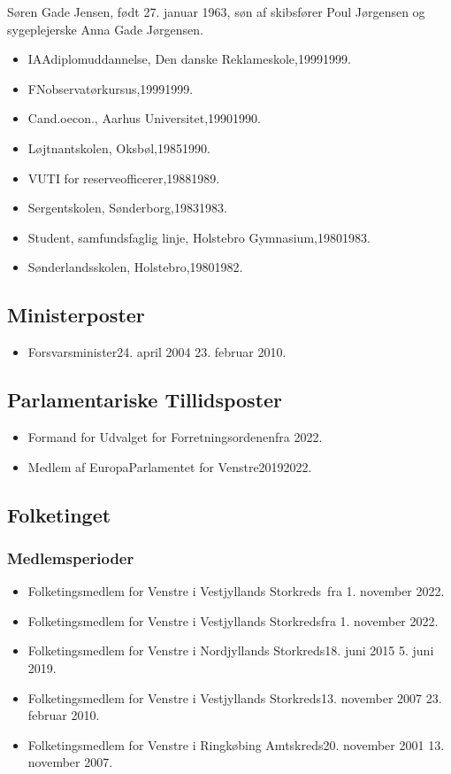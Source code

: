 \documentclass[11pt, a4paper]{awesome-cv}
\begin{document}
\makecvheader[R]
\makelettertitle
\begin{cvletter}
Søren Gade Jensen, født 27. januar 1963, søn af skibsfører Poul Jørgensen og sygeplejerske Anna Gade Jørgensen.

\begin{itemize}
\item IAAdiplomuddannelse, Den danske Reklameskole,19991999.
\item FNobservatørkursus,19991999.
\item Cand.oecon., Aarhus Universitet,19901990.
\item Løjtnantskolen, Oksbøl,19851990.
\item VUTI for reserveofficerer,19881989.
\item Sergentskolen, Sønderborg,19831983.
\item Student, samfundsfaglig linje, Holstebro Gymnasium,19801983.
\item Sønderlandsskolen, Holstebro,19801982.
\end{itemize}
\subsection*{Ministerposter}
\begin{itemize}
\item Forsvarsminister24. april 2004  23. februar 2010.
\end{itemize}
\subsection*{Parlamentariske Tillidsposter}
\begin{itemize}
\item Formand for Udvalget for Forretningsordenenfra 2022.
\item Medlem af EuropaParlamentet for Venstre20192022.
\end{itemize}
\subsection*{Folketinget}
\subsubsection*{Medlemsperioder}
\begin{itemize}
\item Folketingsmedlem for Venstre i Vestjyllands Storkreds fra 1. november 2022.
\item Folketingsmedlem for Venstre i Vestjyllands Storkredsfra 1. november 2022.
\item Folketingsmedlem for Venstre i Nordjyllands Storkreds18. juni 2015  5. juni 2019.
\item Folketingsmedlem for Venstre i Vestjyllands Storkreds13. november 2007  23. februar 2010.
\item Folketingsmedlem for Venstre i Ringkøbing Amtskreds20. november 2001  13. november 2007.
\end{itemize}

\end{cvletter}
\end{document}
